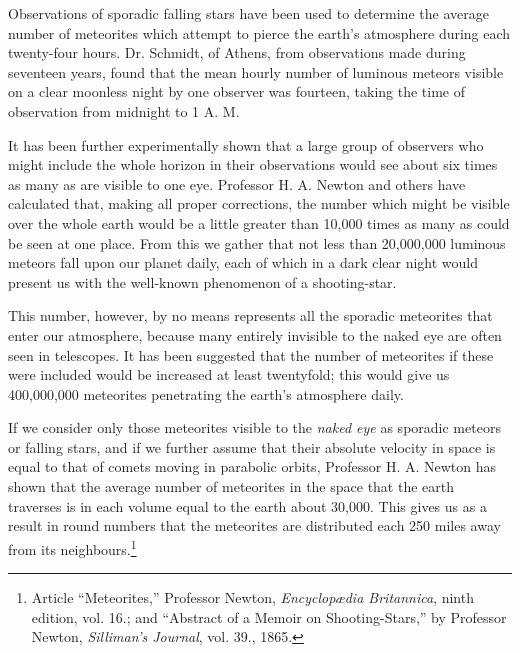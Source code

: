 \documentclass[a4paper, 12pt, oneside, polutonikogreek, english]{article}
\begin{document}
Observations of sporadic falling stars have been used to determine the average number of meteorites which attempt to pierce the earth's atmosphere during each twenty-four hours. Dr. Schmidt, of Athens, from observations made during seventeen years, found that the mean hourly number of luminous meteors visible on a clear moonless night by one observer was fourteen, taking the time of observation from midnight to 1 A. M.

It has been further experimentally shown that a large group of observers who might include the whole horizon in their observations would see about six times as many as are visible to one eye. Professor H. A. Newton and others have calculated that, making all proper corrections, the number which might be visible over the whole earth would be a little greater than 10,000 times as many as could be seen at one place. From this we gather that not less than 20,000,000 luminous meteors fall upon our planet daily, each of which in a dark clear night would present us with the well-known phenomenon of a shooting-star.

This number, however, by no means represents all the sporadic meteorites that enter our atmosphere, because many entirely invisible to the naked eye are often seen in telescopes. It has been suggested that the number of meteorites if these were included would be increased at least twentyfold; this would give us 400,000,000 meteorites penetrating the earth's atmosphere daily.

If we consider only those meteorites visible to the \emph{naked eye} as sporadic meteors or falling stars, and if we further assume that their absolute velocity in space is equal to that of comets moving in parabolic orbits, Professor H. A. Newton has shown that the average number of meteorites in the space that the earth traverses is in each volume equal to the earth about 30,000. This gives us as a result in round numbers that the meteorites are distributed each 250 miles away from its neighbours.\footnote{Article ``Meteorites,'' Professor Newton, \emph{Encyclopædia Britannica}, ninth edition, vol. 16.; and ``Abstract of a Memoir on Shooting-Stars,'' by Professor Newton, \emph{Silliman's Journal}, vol. 39., 1865.}
\end{document}
